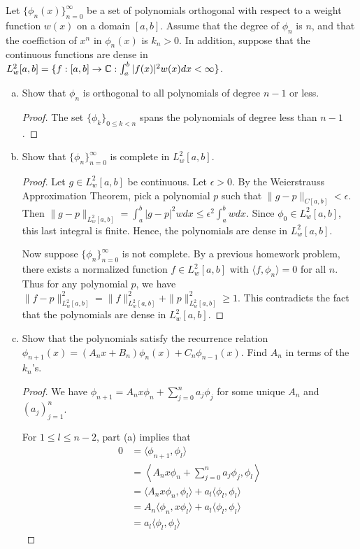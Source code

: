 \documentclass{article}
\begin{document}
  
  Let $\{\phi_n(x)\}_{n=0}^\infty$ be a set of polynomials orthogonal with respect to a weight function $w(x)$ on a domain $[a,b]$. Assume that the degree of $\phi_n$ is $n$, and that the coeffiction of $x^n$ in $\phi_n(x)$ is $k_n > 0$. In addition, suppose that the continuous functions are dense in $L_w^2[a,b] = \{f : [a,b] \to \mathbb{C} : \int_a^b |f(x)|^2 w(x) dx < \infty \}$.

\begin{enumerate}[(a)]
\item Show that $\phi_n$ is orthogonal to all polynomials of degree $n - 1$ or less.
\begin{proof}
The set $\{\phi_k\}_{0 \le k < n}$ spans the polynomials of degree less than $n-1$.
\end{proof}
\item Show that $\{ \phi_n \}_{n=0}^\infty$ is complete in $L_w^2[a,b]$.
\begin{proof}
Let $g \in L_w^2[a,b]$ be continuous.  Let $\epsilon > 0$.  By the Weierstrauss Approximation Theorem, pick a polynomial $p$ such that $\|g - p \|_{C[a,b]} < \epsilon$.  Then
$\|g - p\|_{L_w^2[a,b]} = \int_a^b |g - p|^2 w dx \le \epsilon^2 \int_a^b w dx$.  Since $\phi_0 \in L_w^2[a,b]$, this last integral is finite.  Hence, the polynomials are dense in $L_w^2[a,b]$.

Now suppose $\{ \phi_n \}_{n=0}^\infty$ is not complete. By a previous homework problem, there exists a normalized function $f \in L_w^2[a,b]$ with $\langle f, \phi_n \rangle = 0$ for all $n$.  Thus for any polynomial $p$, we have $\|f - p\|_{L_w^2[a,b]}^2 = \|f\|_{L_w^2[a,b]}^2 + \|p\|_{L_w^2[a,b]}^2 \ge 1$.  This contradicts the fact that the polynomials are dense in ${L_w^2[a,b]}$.

\end{proof}
\item Show that the polynomials satisfy the recurrence relation $\phi_{n+1}(x) = (A_nx + B_n) \phi_n(x) + C_n \phi_{n-1}(x)$. Find $A_n$ in terms of the $k_n$'s.  
\begin{proof}
We have 
$\phi_{n+1} = A_n x \phi_n + \sum_{j=0}^{n} a_j \phi_j$ 
for some unique $A_n$ and $(a_j)_{j=1}^n$.  

For $1 \le l \le n-2$, part (a) implies that 
\begin{align*}
0 & = \langle \phi_{n+1} , \phi_l \rangle 
\\ & = \left\langle A_n x \phi_n + \sum_{j=0}^{n} a_j \phi_j, \phi_l \right\rangle
\\ & = \langle A_n x \phi_n , \phi_l \rangle +  a_l \langle \phi_l, \phi_l \rangle
\\ & =  A_n  \langle \phi_n , x \phi_l \rangle +  a_l \langle \phi_l, \phi_l \rangle
\\ & = a_l \langle \phi_l, \phi_l \rangle
\end{align*}


\end{proof}
\end{enumerate}
\end{document}
